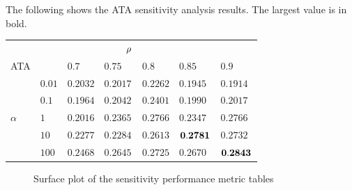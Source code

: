 \documentclass[smallcondensed, final]{svjour3}
\begin{document}
The following shows the ATA sensitivity analysis results. The largest value is in bold.
\begin{center}
\begin{tabular}[c]{l l  l  l  l  l  l}
		& & & $\hspace{8mm}\rho$ & & & \\
 	 ATA  & 	 	& $0.7$ & $0.75$ & $0.8$ & $0.85$ & $0.9$  \\  
	  &$0.01$ 		& $0.2032$ & $0.2017$ & $0.2262$ & $0.1945$ & $0.1914$  \\
		  &$0.1$ 	& $0.1964$ & $0.2042$ & $0.2401$ & $0.1990$ & $0.2017$  \\
$\alpha$ & $1$  	& $0.2016$ & $0.2365$ & $0.2766$ & $0.2347$ & $0.2766$  \\   
  		&$10$   	& $0.2277$ & $0.2284$ & $0.2613$ & $\bold{0.2781}$ & $0.2732$  \\  
 		 &$100$ 	& $0.2468$ & $0.2645$ & $0.2725$ & $0.2670$ & $\bold{0.2843}$  \\
\end{tabular}
\end{center}





\begin{figure}[h]
  \centering             
  \caption{Surface plot of the sensitivity performance metric tables}
  \label{fig:sens_surf}
\end{figure}
\end{document}
